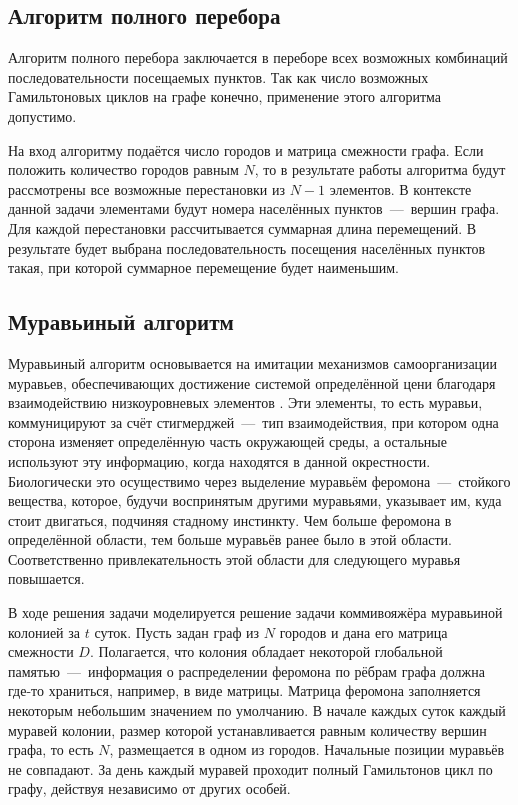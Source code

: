 \subsection{Алгоритм полного перебора}
Алгоритм полного перебора заключается в переборе всех возможных комбинаций последовательности посещаемых пунктов. Так как число возможных Гамильтоновых циклов на графе конечно, применение этого алгоритма допустимо. 

На вход алгоритму подаётся число городов и матрица смежности графа. Если положить количество городов равным $N$, то в результате работы алгоритма будут рассмотрены все возможные перестановки из $N-1$ элементов. В контексте данной задачи элементами будут номера населённых пунктов~---~вершин графа. Для каждой перестановки рассчитывается суммарная длина перемещений. В результате будет выбрана последовательность посещения населённых пунктов такая, при которой суммарное перемещение будет наименьшим. 

\subsection{Муравьиный алгоритм}
Муравьиный алгоритм основывается на имитации механизмов самоорганизации муравьев, обеспечивающих достижение системой определённой цени благодаря взаимодействию низкоуровневых элементов \cite{item14}. Эти элементы, то есть муравьи, коммуницируют за счёт стигмерджей~---~тип взаимодействия, при котором одна сторона изменяет определённую часть окружающей среды, а остальные используют эту информацию, когда находятся в данной окрестности. Биологически это осуществимо через выделение муравьём феромона~---~стойкого вещества, которое, будучи воспринятым другими муравьями, указывает им, куда стоит двигаться, подчиняя стадному инстинкту. Чем больше феромона в определённой области, тем больше муравьёв ранее было в этой области. Соответственно привлекательность этой области для следующего муравья повышается. 

В ходе решения задачи моделируется решение задачи коммивояжёра муравьиной колонией за $t$ суток. Пусть задан граф из $N$ городов и дана его матрица смежности $D$. Полагается, что колония обладает некоторой глобальной памятью~---~информация о распределении феромона по рёбрам графа должна где-то храниться, например, в виде матрицы. Матрица феромона заполняется некоторым небольшим значением по умолчанию. В начале каждых суток каждый муравей колонии, размер которой устанавливается равным количеству вершин графа, то есть $N$, размещается в одном из городов. Начальные позиции муравьёв не совпадают. За день каждый муравей проходит полный Гамильтонов цикл по графу, действуя независимо от других особей.

